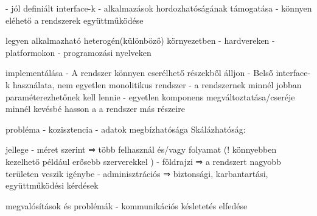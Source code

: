 \documentclass[12pt]{article}
\begin{document}
\begin{description}
                                                                        - jól definiált interface-k
                                                                        - alkalmazások hordozhatóságának támogatása
                                                                        - könnyen eléhető a rendszerek együttműködése
                                                                    \item legyen alkalmazható heterogén(különböző) környezetben
                                                                        - hardvereken
                                                                        - platformokon
                                                                        - programozási nyelveken
                                                                    \item implementálása
                                                                        - A rendszer könnyen cserélhető részekből álljon
                                                                        - Belső interface-k használata, nem egyetlen monolitikus rendszer
                                                                        - a rendszernek minnél jobban paraméterezhetőnek kell lennie
                                                                        - egyetlen komponens megváltoztatása/cseréje minnél kevésbé hasson a a rendszer más részeire
                                                                    \item probléma
                                                                        - kozisztencia
                                                                        - adatok megbízhatósága
                                                                        Skálázhatóság:
                                                                    \item jellege
                                                                        - méret szerint   ⇒ több felhasznál és/vagy folyamat  (! könnyebben kezelhető például erősebb szerverekkel )
                                                                        - földrajzi       ⇒ a rendszert nagyobb területen veszik igénybe
                                                                        - adminisztrációs ⇒ biztonsági, karbantartási, együttműködési kérdések
                                                                    \item megvalósítások és problémák 
                                                                        - kommunikációs késletetés elfedése 

\end{description}
\end{document}
